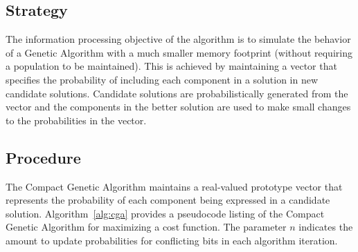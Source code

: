 \subsection{Strategy}
The information processing objective of the algorithm is to simulate the behavior of a Genetic Algorithm with a much smaller memory footprint (without requiring a population to be maintained). 
This is achieved by maintaining a vector that specifies the probability of including each component in a solution in new candidate solutions. Candidate solutions are probabilistically generated from the vector and the components in the better solution are used to make small changes to the probabilities in the vector.

\subsection{Procedure}
The Compact Genetic Algorithm maintains a real-valued prototype vector that represents the probability of each component being expressed in a candidate solution. 
Algorithm~\ref{alg:cga} provides a pseudocode listing of the Compact Genetic Algorithm for maximizing a cost function. The parameter $n$ indicates the amount to update probabilities for conflicting bits in each algorithm iteration.

